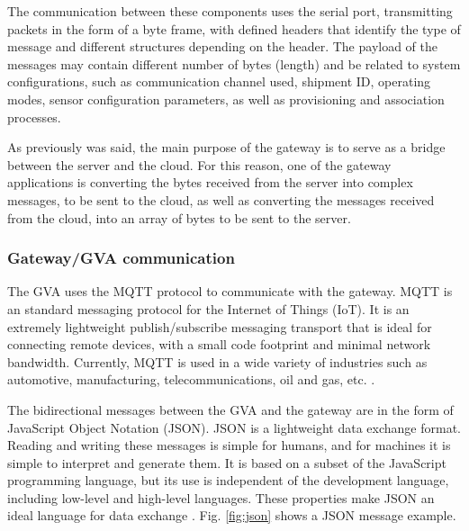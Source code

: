 \documentclass[journal]{IEEEtran}	%
\begin{document}
The communication between these components uses the serial port, transmitting packets in the form of a byte frame, with defined headers that identify the type of message and different structures depending on the header. The payload of the messages may contain different number of bytes (length) and be related to system configurations, such as communication channel used, shipment ID, operating modes, sensor configuration parameters, as well as provisioning and association processes. 

As previously was said, the main purpose of the gateway is to serve as a bridge between the server and the cloud. For this reason, one of the gateway applications is converting the bytes received from the server into complex messages, to be sent to the cloud, as well as converting the messages received from the cloud, into an array of bytes to be sent to the server.


\subsubsection{Gateway/GVA communication}


The GVA uses the MQTT protocol to communicate with the gateway. MQTT is an standard messaging protocol for the Internet of Things (IoT). It is an extremely lightweight publish/subscribe messaging transport that is ideal for connecting remote devices, with a small code footprint and minimal network bandwidth. Currently, MQTT is used in a wide variety of industries such as automotive, manufacturing, telecommunications, oil and gas, etc. \cite{mqtt}.

The bidirectional messages between the GVA and the gateway are in the form of JavaScript Object Notation (JSON). JSON is a lightweight data exchange format. Reading and writing these messages is simple for humans, and for machines it is simple to interpret and generate them. It is based on a subset of the JavaScript programming language, but its use is independent of the development language, including low-level and high-level languages. These properties make JSON an ideal language for data exchange \cite{json}. Fig. \ref{fig:json} shows a JSON message example.
\end{document}
